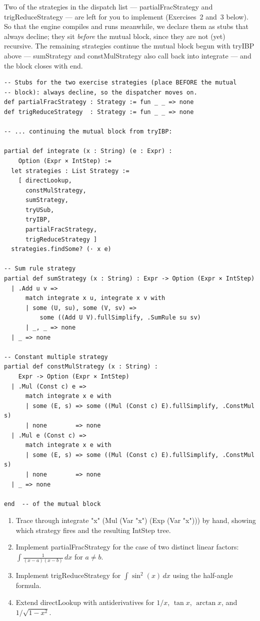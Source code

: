 \documentclass[12pt, openany]{book}
\theoremstyle{plain}
\theoremstyle{definition}
\theoremstyle{remark}
\newcommand{\li}[1]{{\ttfamily\small\color{tealaccent}#1}}
\begin{document}
Two of the strategies in the dispatch list --- \li{partialFracStrategy} and \li{trigReduceStrategy} --- are left for you to implement (Exercises~2 and~3 below).  So that the engine compiles and runs meanwhile, we declare them as stubs that always decline; they sit \emph{before} the \li{mutual} block, since they are not (yet) recursive.  The remaining strategies continue the \li{mutual} block begun with \li{tryIBP} above --- \li{sumStrategy} and \li{constMulStrategy} also call back into \li{integrate} --- and the block closes with \li{end}.

\begin{leanbox}
\begin{lstlisting}
-- Stubs for the two exercise strategies (place BEFORE the mutual
-- block): always decline, so the dispatcher moves on.
def partialFracStrategy : Strategy := fun _ _ => none
def trigReduceStrategy  : Strategy := fun _ _ => none

-- ... continuing the mutual block from tryIBP:

partial def integrate (x : String) (e : Expr) :
    Option (Expr × IntStep) :=
  let strategies : List Strategy :=
    [ directLookup,
      constMulStrategy,
      sumStrategy,
      tryUSub,
      tryIBP,
      partialFracStrategy,
      trigReduceStrategy ]
  strategies.findSome? (· x e)

-- Sum rule strategy
partial def sumStrategy (x : String) : Expr -> Option (Expr × IntStep)
  | .Add u v =>
      match integrate x u, integrate x v with
      | some (U, su), some (V, sv) =>
          some ((Add U V).fullSimplify, .SumRule su sv)
      | _, _ => none
  | _ => none

-- Constant multiple strategy
partial def constMulStrategy (x : String) :
    Expr -> Option (Expr × IntStep)
  | .Mul (Const c) e =>
      match integrate x e with
      | some (E, s) => some ((Mul (Const c) E).fullSimplify, .ConstMul s)
      | none        => none
  | .Mul e (Const c) =>
      match integrate x e with
      | some (E, s) => some ((Mul (Const c) E).fullSimplify, .ConstMul s)
      | none        => none
  | _ => none

end  -- of the mutual block
\end{lstlisting}
\end{leanbox}
\color{black}

\begin{exbox}
\begin{enumerate}
  \item Trace through \li{integrate "x" (Mul (Var "x") (Exp (Var "x")))} by hand,
        showing which strategy fires and the resulting \li{IntStep} tree.
  \item Implement \li{partialFracStrategy} for the case of two distinct linear
        factors: $\int \frac{1}{(x-a)(x-b)}\,dx$ for $a\neq b$.
  \item Implement \li{trigReduceStrategy} for $\int \sin^2(x)\,dx$ using the
        half-angle formula.
  \item Extend \li{directLookup} with antiderivatives for $1/x$, $\tan x$,
        $\arctan x$, and $1/\sqrt{1-x^2}$.
\end{enumerate}
\end{exbox}
\color{black}
\end{document}
